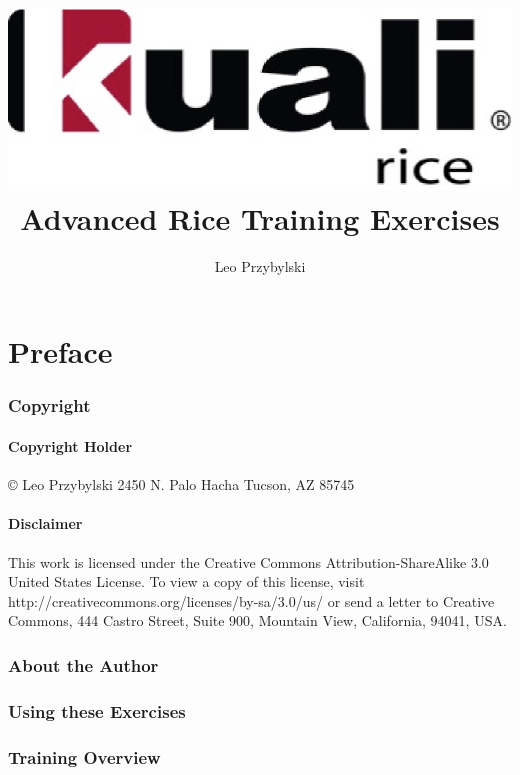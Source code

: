 \documentclass[letterpaper,notitlepage,12pt]{book}
\author{Leo Przybylski}
\title{\includegraphics[width=\textwidth]{cover.eps}\\Advanced Rice Training Exercises}
\date{}
\begin{document}
\maketitle
\tableofcontents
\part*{Preface}
\section{Copyright}
\subsection{Copyright Holder}
\copyright
Leo Przybylski
2450 N. Palo Hacha
Tucson, AZ 85745

\subsection{Disclaimer}
This work is licensed under the Creative Commons Attribution-ShareAlike 3.0 United States License. To view a copy of this license, visit http://creativecommons.org/licenses/by-sa/3.0/us/ or send a letter to Creative Commons, 444 Castro Street, Suite 900, Mountain View, California, 94041, USA.
\section{About the Author}
\section{Using these Exercises}
\section{Training Overview}







\end{document}
